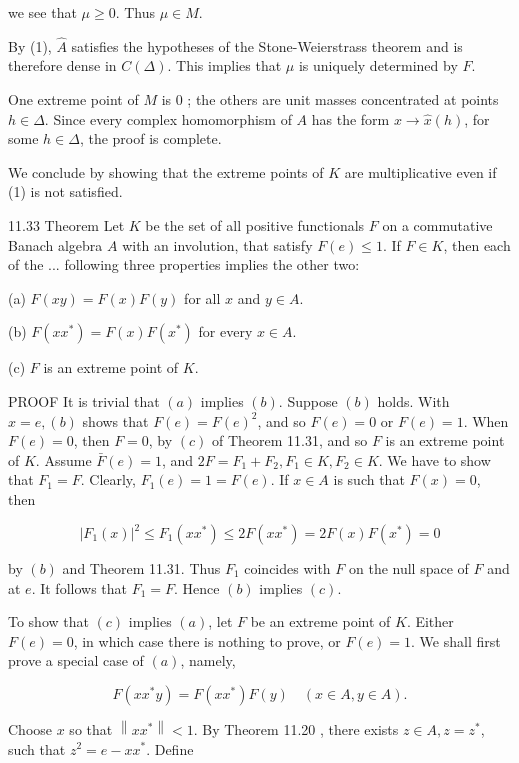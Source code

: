 \documentclass[10pt]{article}
\begin{document}
we see that $\mu \geq 0$. Thus $\mu \in M$.

By (1), $\hat{A}$ satisfies the hypotheses of the Stone-Weierstrass theorem and is therefore dense in $C(\Delta)$. This implies that $\mu$ is uniquely determined by $F$.

One extreme point of $M$ is 0 ; the others are unit masses concentrated at points $h \in \Delta$. Since every complex homomorphism of $A$ has the form $x \rightarrow \hat{x}(h)$, for some $h \in \Delta$, the proof is complete.

We conclude by showing that the extreme points of $K$ are multiplicative even if (1) is not satisfied.

11.33 Theorem Let $K$ be the set of all positive functionals $F$ on a commutative Banach algebra $A$ with an involution, that satisfy $F(e) \leq 1$. If $F \in K$, then each of the ... following three properties implies the other two:

(a) $F(x y)=F(x) F(y)$ for all $x$ and $y \in A$.

(b) $F\left(x x^{*}\right)=F(x) F\left(x^{*}\right)$ for every $x \in A$.

(c) $F$ is an extreme point of $K$.

PROOF It is trivial that $(a)$ implies $(b)$. Suppose $(b)$ holds. With $x=e,(b)$ shows that $F(e)=F(e)^{2}$, and so $F(e)=0$ or $F(e)=1$. When $F(e)=0$, then $F=0$, by $(c)$ of Theorem 11.31, and so $F$ is an extreme point of $K$. Assume $\bar{F}(e)=1$, and $2 F=F_{1}+F_{2}, F_{1} \in K, F_{2} \in K$. We have to show that $F_{1}=F$. Clearly, $F_{1}(e)=1=F(e)$. If $x \in A$ is such that $F(x)=0$, then

$$
\left|F_{1}(x)\right|^{2} \leq F_{1}\left(x x^{*}\right) \leq 2 F\left(x x^{*}\right)=2 F(x) F\left(x^{*}\right)=0
$$

by $(b)$ and Theorem 11.31. Thus $F_{1}$ coincides with $F$ on the null space of $F$ and at $e$. It follows that $F_{1}=F$. Hence $(b)$ implies $(c)$.

To show that $(c)$ implies $(a)$, let $F$ be an extreme point of $K$. Either $F(e)=0$, in which case there is nothing to prove, or $F(e)=1$. We shall first prove a special case of $(a)$, namely,

$$
F\left(x x^{*} y\right)=F\left(x x^{*}\right) F(y) \quad(x \in A, y \in A) .
$$

Choose $x$ so that $\left\|x x^{*}\right\|<1$. By Theorem 11.20 , there exists $z \in A, z=z^{*}$, such that $z^{2}=e-x x^{*}$. Define
\end{document}
